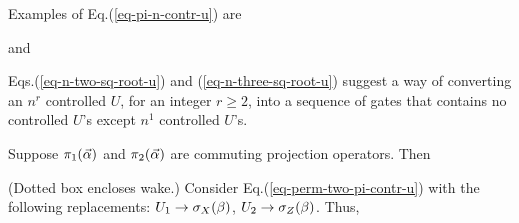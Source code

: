 Examples of Eq.(\ref{eq-pi-n-contr-u}) are

and


Eqs.(\ref{eq-n-two-sq-root-u})
and (\ref{eq-n-three-sq-root-u})
suggest a way of converting
an $n^r$ controlled $U$,
for an integer $r\geq 2$,
into a sequence of gates
that contains no controlled $U$'s
except $n^1$ controlled $U$'s.

\claim

Suppose $\pi_1({\vec{\alpha}})$
and $\pi_2({\vec{\alpha}})$ are
commuting projection operators. Then

(Dotted box encloses wake.)
\proof
Consider Eq.(\ref{eq-perm-two-pi-contr-u})
with the following replacements:
$U_1\rightarrow {\sigma_X}(\beta)$,
$U_2\rightarrow {\sigma_Z}(\beta)$.
Thus,

